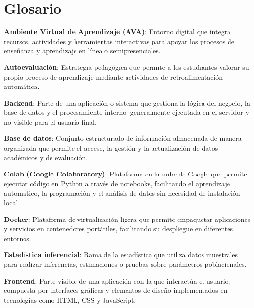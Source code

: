\documentclass[letter,oneside,12pt,spanish]{report}
\begin{document}
\parskip=12pt
\tableofcontents                    

\newpage

\listoffigures                         %
\newpage

\chapter*{Glosario}

\begin{description}

\item \textbf{Ambiente Virtual de Aprendizaje (AVA)}: Entorno digital que integra recursos, actividades y herramientas interactivas para apoyar los procesos de enseñanza y aprendizaje en línea o semipresenciales.
\item \textbf{Autoevaluación}: Estrategia pedagógica que permite a los estudiantes valorar su propio proceso de aprendizaje mediante actividades de retroalimentación automática.
\item \textbf{Backend}: Parte de una aplicación o sistema que gestiona la lógica del negocio, la base de datos y el procesamiento interno, generalmente ejecutada en el servidor y no visible para el usuario final.
\item \textbf{Base de datos}: Conjunto estructurado de información almacenada de manera organizada que permite el acceso, la gestión y la actualización de datos académicos y de evaluación.
\item \textbf{Colab (Google Colaboratory)}: Plataforma en la nube de Google que permite ejecutar código en Python a través de notebooks, facilitando el aprendizaje automático, la programación y el análisis de datos sin necesidad de instalación local.
\item \textbf{Docker}: Plataforma de virtualización ligera que permite empaquetar aplicaciones y servicios en contenedores portátiles, facilitando su despliegue en diferentes entornos.
\item \textbf{Estadística inferencial}: Rama de la estadística que utiliza datos muestrales para realizar inferencias, estimaciones o pruebas sobre parámetros poblacionales.
\item \textbf{Frontend}: Parte visible de una aplicación con la que interactúa el usuario, compuesta por interfaces gráficas y elementos de diseño implementados en tecnologías como HTML, CSS y JavaScript.

\end{description}
\end{document}
